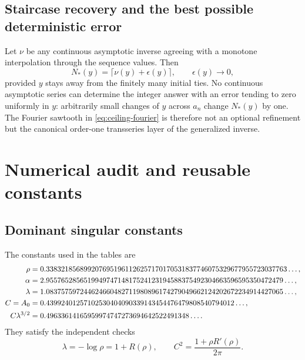 \documentclass[11pt,a4paper,oneside,openany]{book}
\theoremstyle{definition}
\theoremstyle{remark}
\begin{document}
\section{Staircase recovery and the best possible deterministic error}
Let $\nu$ be any continuous asymptotic inverse agreeing with a monotone
interpolation through the sequence values.  Then
\begin{equation}
 N_*(y)=\lceil \nu(y)+\epsilon(y)\rceil,
 \qquad \epsilon(y)\to0,
 \label{eq:staircase-general}
\end{equation}
provided $y$ stays away from the finitely many initial ties.  No continuous
asymptotic series can determine the integer answer with an error tending to
zero uniformly in $y$: arbitrarily small changes of $y$ across $a_n$ change
$N_*(y)$ by one.  The Fourier sawtooth in \cref{eq:ceiling-fourier} is therefore
not an optional refinement but the canonical order-one transseries layer of
the generalized inverse.

\chapter{Numerical audit and reusable constants}
\label{app:numerical-audit}

\section{Dominant singular constants}
The constants used in the tables are
\begin{align}
 \rho={}&0.3383218568992076951961126257170170531837746075329677955723037763
 \ldots,\notag\\
 \alpha={}&2.955765285651994974714817524123194588375492304663596595350472479
 \ldots,\notag\\
 \lambda={}&1.083757597244624660482711980896174279049662124202672234914427065
 \ldots,\notag\\
 C=A_0={}&0.43992401257102530404090339143454476479808540794012\ldots,\notag\\
 C\lambda^{3/2}={}&0.49633614165959974747273694642522491348\ldots .
 \label{eq:numerical-audit-constants}
\end{align}
They satisfy the independent checks
\begin{equation}
 \lambda=-\log\rho=1+R(\rho),
 \qquad
 C^2=\frac{1+\rho R'(\rho)}{2\pi}.
 \label{eq:constant-checks}
\end{equation}
\end{document}
